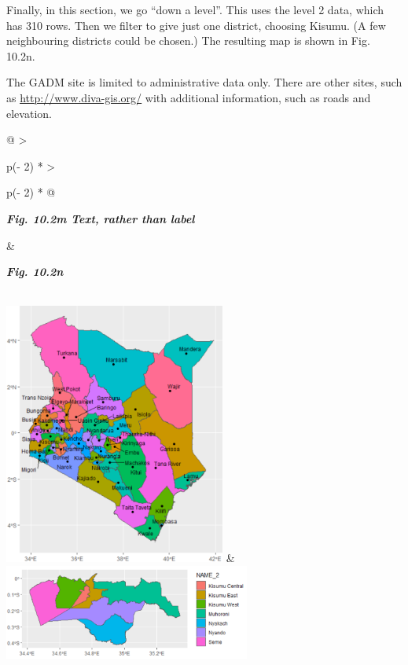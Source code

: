 \documentclass[
  letterpaper,
  DIV=11,
  numbers=noendperiod]{scrreprt}
\begin{document}
Finally, in this section, we go ``down a level''. This uses the level 2
data, which has 310 rows. Then we filter to give just one district,
choosing Kisumu. (A few neighbouring districts could be chosen.) The
resulting map is shown in Fig. 10.2n.

The GADM site is limited to administrative data only. There are other
sites, such as
\href{http://www.diva-gis.org/}{\ul{http://www.diva-gis.org/}} with
additional information, such as roads and elevation.

\begin{longtable}[]{@{}
  >{\raggedright\arraybackslash}p{(\columnwidth - 2\tabcolsep) * }
  >{\raggedright\arraybackslash}p{(\columnwidth - 2\tabcolsep) * }@{}}
\toprule\noalign{}
\begin{minipage}[b]{\linewidth}\raggedright
\textbf{\emph{Fig. 10.2m Text, rather than label}}
\end{minipage} & \begin{minipage}[b]{\linewidth}\raggedright
\textbf{\emph{Fig. 10.2n}}
\end{minipage} \\
\midrule\noalign{}
\endhead
\bottomrule\noalign{}
\endlastfoot
\includegraphics[width=2.86528in,height=3.39383in]{figures/Fig10.2m.png}
&
\includegraphics[width=3.1924in,height=1.23171in]{figures/Fig10.2n.png} \\
\end{longtable}
\end{document}
